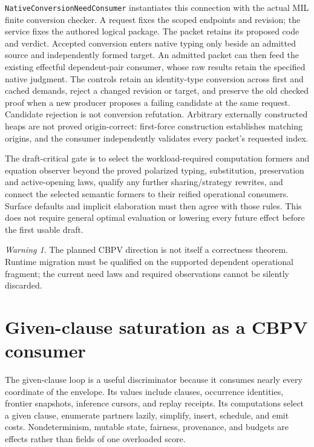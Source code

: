 \documentclass[11pt]{article}
\theoremstyle{definition}
\theoremstyle{remark}
\newtheorem{warning}[theorem]{Warning}
\begin{document}
\nolinkurl{NativeConversionNeedConsumer} instantiates this connection with
the actual MIL finite conversion checker. A request fixes the scoped endpoints
and revision; the service fixes the authored logical package. The packet
retains its proposed code and verdict. Accepted conversion enters native
typing only beside an admitted source and independently formed target.
An admitted packet can then feed the existing effectful dependent-pair
consumer, whose raw results retain the specified native judgment.
The controls retain an identity-type conversion across first and cached
demands, reject a changed revision or target, and preserve the old checked
proof when a new producer proposes a failing candidate at the same request.
Candidate rejection is not conversion refutation. Arbitrary externally
constructed heaps are not proved origin-correct: first-force construction
establishes matching origins, and the consumer independently validates every
packet's requested index.

The draft-critical gate is to select the workload-required computation
formers and equation observer beyond the proved polarized typing,
substitution, preservation and active-opening laws, qualify any further
sharing/strategy rewrites, and connect the selected semantic formers to
their reified operational consumers. Surface defaults and implicit elaboration must
then agree with those rules. This does not require general optimal evaluation
or lowering every future effect before the first usable draft.

\begin{warning}
The planned CBPV direction is not itself a correctness theorem. Runtime
migration must be qualified on the supported dependent operational fragment;
the current need laws and required observations cannot be silently discarded.
\end{warning}

\section{Given-clause saturation as a CBPV consumer}

The given-clause loop is a useful discriminator because it consumes nearly every
coordinate of the envelope.  Its values include clauses, occurrence identities,
frontier snapshots, inference cursors, and replay receipts.  Its computations
select a given clause, enumerate partners lazily, simplify, insert, schedule, and
emit costs.  Nondeterminism, mutable state, fairness, provenance, and budgets are
effects rather than fields of one overloaded score.
\end{document}
